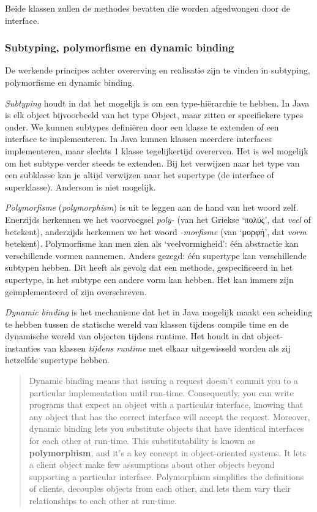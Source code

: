 Beide klassen zullen de methodes bevatten die worden afgedwongen door de 
interface.

\subsubsection{Subtyping, polymorfisme en dynamic binding}
De werkende principes achter overerving en realisatie zijn te vinden in 
subtyping, polymorfisme en dynamic binding.

\textit{Subtyping} houdt in dat het mogelijk is om een type-hiërarchie te hebben.
In Java is elk object bijvoorbeeld van het type Object, maar zitten er specifiekere
types onder. We kunnen subtypes definiëren door een klasse te extenden of 
een interface te implementeren. In Java kunnen klassen meerdere interfaces implementeren, 
maar slechts 1 klasse tegelijkertijd overerven. Het is wel mogelijk om het subtype verder 
steeds te extenden. Bij het verwijzen naar het type van een subklasse kan je altijd 
verwijzen naar het supertype (de interface of superklasse). Andersom is niet mogelijk.

\textit{Polymorfisme} (\textit{polymorphism}) is uit te leggen 
aan de hand van het woord zelf. Enerzijds herkennen we
het voorvoegsel \textit{poly-} (van het Griekse `πολύς', dat \textit{veel} of betekent), 
anderzijds herkennen we het woord \textit{-morfisme} (van `μορφή', dat \textit{vorm} betekent).
Polymorfisme kan men zien als `veelvormigheid': één abstractie kan verschillende vormen aannemen.
Anders gezegd: één supertype kan verschillende subtypen hebben.
Dit heeft als gevolg dat een methode, gespecificeerd in het supertype, 
in het subtype een andere vorm kan hebben. Het kan immers zijn geïmplementeerd of 
zijn overschreven.

\textit{Dynamic binding} is het mechanisme dat het in Java mogelijk maakt
een scheiding te hebben tussen de statische wereld van klassen tijdens compile time 
en de dynamische wereld van objecten tijdens runtime. Het houdt in dat
object-instanties van klassen \textit{tijdens runtime} met elkaar uitgewisseld 
worden als zij hetzelfde supertype hebben.

\blockquote{
Dynamic binding means that issuing a request doesn't commit you to a particular
implementation until run-time. Consequently, you can write programs that expect an
object with a particular interface, knowing that any object that has the correct interface
will accept the request. Moreover, dynamic binding lets you substitute objects that
have identical interfaces for each other at run-time. This substitutability is known as
\textbf{polymorphism}, and it's a key concept in object-oriented systems. It lets a client object
make few assumptions about other objects beyond supporting a particular interface.
Polymorphism simplifies the definitions of clients, decouples objects from each other,
and lets them vary their relationships to each other at run-time.
}{\cite{Gof1994}}

